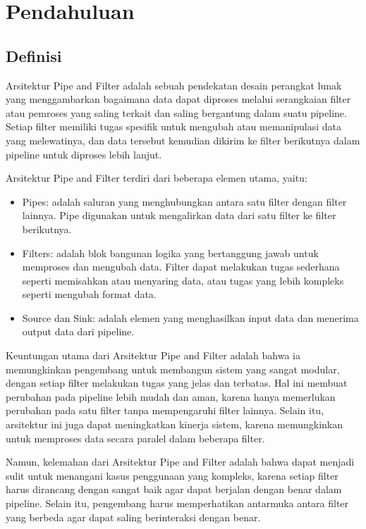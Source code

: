 \chapter{Pendahuluan}

	\section{Definisi}
		Arsitektur Pipe and Filter adalah sebuah pendekatan desain perangkat lunak yang menggambarkan bagaimana data dapat diproses melalui serangkaian filter atau pemroses yang saling terkait dan saling bergantung dalam suatu pipeline. Setiap filter memiliki tugas spesifik untuk mengubah atau memanipulasi data yang melewatinya, dan data tersebut kemudian dikirim ke filter berikutnya dalam pipeline untuk diproses lebih lanjut.
	
	Arsitektur Pipe and Filter terdiri dari beberapa elemen utama, yaitu:
	\begin{itemize}
		\item Pipes: adalah saluran yang menghubungkan antara satu filter dengan filter lainnya. Pipe digunakan untuk mengalirkan data dari satu filter ke filter berikutnya.
		\item Filters: adalah blok bangunan logika yang bertanggung jawab untuk memproses dan mengubah data. Filter dapat melakukan tugas sederhana seperti memisahkan atau menyaring data, atau tugas yang lebih kompleks seperti mengubah format data.
		\item Source dan Sink: adalah elemen yang menghasilkan input data dan menerima output data dari pipeline.
	\end{itemize}
	
	Keuntungan utama dari Arsitektur Pipe and Filter adalah bahwa ia memungkinkan pengembang untuk membangun sistem yang sangat modular, dengan setiap filter melakukan tugas yang jelas dan terbatas. Hal ini membuat perubahan pada pipeline lebih mudah dan aman, karena hanya memerlukan perubahan pada satu filter tanpa mempengaruhi filter lainnya. Selain itu, arsitektur ini juga dapat meningkatkan kinerja sistem, karena memungkinkan untuk memproses data secara paralel dalam beberapa filter.
	
	Namun, kelemahan dari Arsitektur Pipe and Filter adalah bahwa dapat menjadi sulit untuk menangani kasus penggunaan yang kompleks, karena setiap filter harus dirancang dengan sangat baik agar dapat berjalan dengan benar dalam pipeline. Selain itu, pengembang harus memperhatikan antarmuka antara filter yang berbeda agar dapat saling berinteraksi dengan benar.
	
